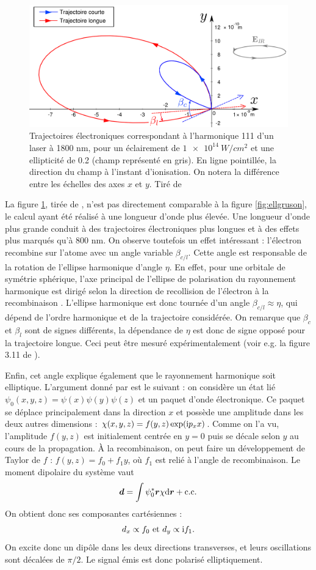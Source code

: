 \begin{figure}[!ht]
\centering
\includegraphics[width=0.9\columnwidth]{Figures/Polar/higuet.png}%
\caption{Trajectoires électroniques correspondant à l’harmonique 111 d'un laser à 1800 nm, pour un éclairement de $\SI{1e14}{W/cm^2}$ et une ellipticité de 0.2 (champ représenté en gris).
En ligne pointillée, la direction du champ à l’instant d’ionisation. On notera la différence entre les échelles
des axes $x$ et $y$. Tiré de }
\label{fig:ellhiguet}%
\end{figure}

La figure \ref{fig:ellhiguet}, tirée de , n'est pas directement comparable à la figure \ref{fig:ellgruson}, le calcul ayant été réalisé à une longueur d'onde plus élevée. Une longueur d'onde plus grande conduit à des trajectoires électroniques plus longues et à des effets plus marqués qu'à 800 nm.
On observe toutefois un effet intéressant : l'électron recombine sur l'atome avec un angle variable $\beta_{c/l}$. Cette angle est responsable de la rotation de l'ellipse harmonique d'angle $\eta$. En effet, pour une orbitale de symétrie sphérique, l'axe principal de l'ellipse de polarisation du rayonnement harmonique est dirigé selon la direction de recollision de l'électron à la recombinaison . L'ellipse harmonique est donc tournée d'un angle $\beta_{c/l}\approx\eta$, qui dépend de l'ordre harmonique et de la trajectoire considérée. On remarque que $\beta_c$ et $\beta_l$ sont de signes différents, la dépendance de $\eta$ est donc de signe opposé pour la trajectoire longue. Ceci peut être mesuré expérimentalement (voir e.g. la figure 3.11 de ).\par
Enfin, cet angle explique également que le rayonnement harmonique soit elliptique. L'argument donné par  est le suivant : on considère un état lié $\psi_0(x,y,z) = \psi(x)\psi(y)\psi(z)$ et un paquet d'onde électronique. Ce paquet se déplace principalement dans la direction $x$ et possède une amplitude dans les deux autres dimensions : $\chi(x,y,z) = f(y,z)\exp(\mathrm{i} p_x x)$. Comme on l'a vu, l'amplitude $f(y,z)$ est initialement centrée en $y=0$ puis se décale selon $y$ au cours de la propagation. \`{A} la recombinaison, on peut faire un développement de Taylor de $f$ : $f(y,z) = f_0 + f_1 y$, où $f_1$ est relié à l'angle de recombinaison. Le moment dipolaire du système vaut 
\[\bm{d} = \int{\psi_0^* \bm{r} \chi \mathrm{d}\bm{r}} + \text{c.c.}\]
On obtient donc ses composantes cartésiennes :
\[d_x \propto f_0 \text{  et  } d_y \propto \mathrm{i} f_1.\]
On excite donc un dipôle dans les deux directions transverses, et leurs oscillations sont décalées de $\pi/2$. Le signal émis est donc polarisé elliptiquement.

